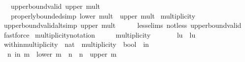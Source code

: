 \begin{isabellebody}
\ \ \ upper{\isacharunderscore}bound{\isacharunderscore}valid{\isacharcolon}\ {\isachardoublequoteopen}upper\ mult\ {\isasymnoteq}\ \isanewline
\ \ \ properly{\isacharunderscore}bounded{\isacharbrackleft}simp{\isacharbrackright}{\isacharcolon}\ {\isachardoublequoteopen}lower\ mult\ {\isasymle}\ upper\ mult{\isachardoublequoteclose}\isanewline
\isanewline
{}\isamarkupfalse%
\ multiplicity\isanewline
{}\isanewline
\isanewline
{}\isamarkupfalse%
\ upper{\isacharunderscore}bound{\isacharunderscore}valid{\isacharunderscore}alt{\isacharbrackleft}simp{\isacharbrackright}{\isacharcolon}\ {\isachardoublequoteopen}upper\ mult\ {\isasymge}\ \isanewline
%
\isadelimproof
\ \ %
\endisadelimproof
%
\isatagproof
{}\isamarkupfalse%
\ less{\isacharunderscore}{\isasymM}{\isachardot}elims\ not{\isacharunderscore}less\ upper{\isacharunderscore}bound{\isacharunderscore}valid\ \isamarkupfalse%
\ fastforce%
\endisatagproof
{\isafoldproof}%
%
\isadelimproof
\isanewline
%
\endisadelimproof
\isanewline
{}\isamarkupfalse%
\isanewline
\isanewline
{}\isamarkupfalse%
\ multiplicity{\isacharunderscore}notation\ {\isacharcolon}{\isacharcolon}\ {\isachardoublequoteopen}{\isasymM}\ {\isasymRightarrow}\ {\isasymM}\ {\isasymRightarrow}\ multiplicity{\isachardoublequoteclose}\ {\isacharparenleft}{\isachardoublequoteopen}{\isacharparenleft}{\isacharunderscore}{\isacharslash}{\isachardot}{\isachardot}{\isacharunderscore}{\isacharparenright}{\isachardoublequoteclose}\ {\isacharbrackleft}{}{}{\isacharcomma}\ {}{}{\isacharbrackright}\ {}{}{\isacharparenright}\ \isanewline
\ \ {\isachardoublequoteopen}l{\isachardot}{\isachardot}u\ {\isasymequiv}\ {\isacharparenleft}l{\isacharcomma}u{\isacharparenright}{\isachardoublequoteclose}\isanewline
\isanewline
{}\isamarkupfalse%
\ within{\isacharunderscore}multiplicity\ {\isacharcolon}{\isacharcolon}\ {\isachardoublequoteopen}nat\ {\isasymRightarrow}\ multiplicity\ {\isasymRightarrow}\ bool{\isachardoublequoteclose}\ {\isacharparenleft}\ {\isachardoublequoteopen}in{\isachardoublequoteclose}\ {}{}{\isacharparenright}\ \isanewline
\ \ {\isachardoublequoteopen}n\ in\ m\ {\isasymequiv}\ lower\ m\ {\isasymle}\ \isactrlbold n\ {\isasymand}\ \isactrlbold n\ {\isasymle}\ upper\ m{\isachardoublequoteclose}\isanewline

\end{isabellebody}
